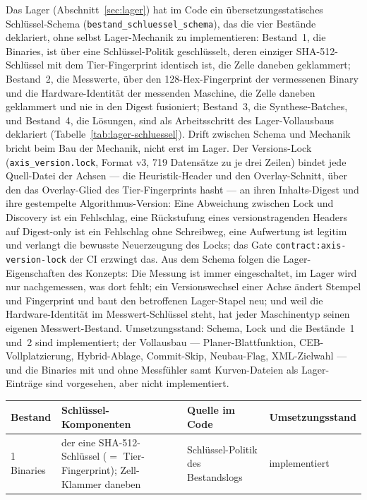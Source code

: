 \begin{nurlang}
Das Lager (Abschnitt~\ref{sec:lager}) hat im Code ein übersetzungsstatisches Schlüssel-Schema
(\texttt{bestand\_\allowbreak{}schluessel\_\allowbreak{}schema}), das die vier Bestände deklariert, ohne
selbst Lager-Mechanik zu implementieren: Bestand~1, die Binaries, ist über eine Schlüssel-Politik geschlüsselt,
deren einziger SHA-512-Schlüssel mit dem Tier-Fingerprint identisch ist, die Zelle daneben geklammert;
Bestand~2, die Messwerte, über den 128-Hex-Fingerprint der vermessenen Binary und die Hardware-Identität
der messenden Maschine, die Zelle daneben geklammert und nie in den Digest fusioniert; Bestand~3, die
Synthese-Batches, und Bestand~4, die Lösungen, sind als Arbeitsschritt des Lager-Vollausbaus deklariert
(Tabelle~\ref{tab:lager-schluessel}). Drift zwischen Schema und Mechanik bricht beim Bau der Mechanik,
nicht erst im Lager. Der Versions-Lock (\texttt{axis\_version.lock}, Format v3, 719 Datensätze zu je drei
Zeilen) bindet jede Quell-Datei der Achsen --- die Heuristik-Header und den Overlay-Schnitt, über den das
Overlay-Glied des Tier-Fingerprints hasht --- an ihren Inhalts-Digest und ihre gestempelte
Algorithmus-Version: Eine Abweichung zwischen Lock und Discovery ist ein Fehlschlag, eine Rückstufung eines
versionstragenden Headers auf Digest-only ist ein Fehlschlag ohne Schreibweg, eine Aufwertung ist legitim und
verlangt die bewusste Neuerzeugung des Locks; das Gate \texttt{contract:axis-version-lock} der CI erzwingt das. Aus
dem Schema folgen die Lager-Eigenschaften des Konzepts: Die Messung ist immer eingeschaltet, im Lager wird
nur nachgemessen, was dort fehlt; ein Versionswechsel einer Achse ändert Stempel und Fingerprint und baut
den betroffenen Lager-Stapel neu; und weil die Hardware-Identität im Messwert-Schlüssel steht, hat jeder
Maschinentyp seinen eigenen Messwert-Bestand. Umsetzungsstand: Schema, Lock und die Bestände~1 und~2
sind implementiert; der Vollausbau --- Planer-Blattfunktion, CEB-Vollplatzierung, Hybrid-Ablage, Commit-Skip,
Neubau-Flag, XML-Zielwahl --- und die Binaries mit und ohne Messfühler samt Kurven-Dateien als
Lager-Einträge sind vorgesehen, aber nicht implementiert.
\begin{table}[htbp]\centering\footnotesize
\begin{tabular}{@{}lp{6.2cm}p{3.0cm}p{2.6cm}@{}}
\toprule
Bestand & Schlüssel-Komponenten & Quelle im Code & Umsetzungsstand \\
\midrule
1 Binaries & der eine SHA-512-Schlüssel ($=$ Tier-Fingerprint); Zell-Klammer daneben & Schlüssel-Politik des Bestandslogs & implementiert \\

\end{tabular}
\end{table}
\end{nurlang}
